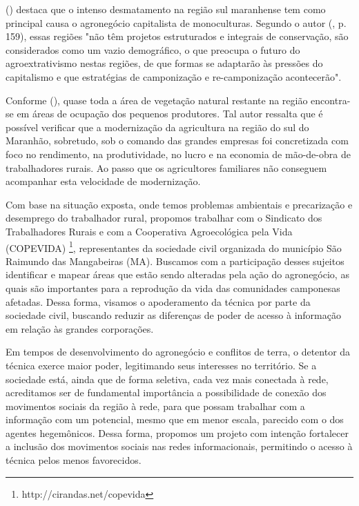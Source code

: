  (\citeyear{meiners2013}) destaca que o intenso desmatamento na região sul maranhense tem como principal causa o agronegócio capitalista de monoculturas. Segundo o autor (\citeyear{meiners2013}, p. 159), essas regiões "não têm projetos estruturados e integrais de conservação, são considerados como um vazio demográfico, o que preocupa o futuro do agroextrativismo nestas regiões, de que formas se adaptarão às pressões do capitalismo e que estratégias de camponização e re-camponização acontecerão".

Conforme  (\citeyear{studte2008}), quase toda a área de vegetação natural restante na região encontra-se em áreas de ocupação dos pequenos produtores. Tal autor ressalta que é possível verificar que a modernização  da  agricultura na região do sul do Maranhão, sobretudo, sob o comando das grandes empresas foi concretizada  com foco no rendimento, na produtividade, no lucro e na economia de mão-de-obra de trabalhadores rurais. Ao passo que os agricultores familiares não conseguem acompanhar esta velocidade de modernização.

Com base na situação exposta, onde temos problemas ambientais e precarização e desemprego do trabalhador rural, propomos trabalhar com o Sindicato dos Trabalhadores Rurais e com a Cooperativa Agroecológica pela Vida (COPEVIDA) \footnote{http://cirandas.net/copevida}, representantes da sociedade civil organizada do município São Raimundo das Mangabeiras (MA). Buscamos com a participação desses sujeitos identificar e mapear áreas que estão sendo alteradas pela ação do agronegócio, as quais são importantes para a reprodução da vida das comunidades camponesas afetadas. Dessa forma, visamos o apoderamento da técnica por parte da sociedade civil, buscando reduzir as diferenças de poder de acesso à informação em relação às grandes corporações.

Em tempos de desenvolvimento do agronegócio e conflitos de terra, o detentor da técnica exerce maior poder, legitimando seus interesses no território. Se a sociedade está, ainda que de forma seletiva, cada vez mais conectada à rede, acreditamos ser de fundamental importância a possibilidade de conexão dos movimentos sociais da região à rede, para que possam trabalhar com a informação com um potencial, mesmo que em menor escala, parecido com o dos agentes hegemônicos. Dessa forma, propomos um projeto com intenção fortalecer a inclusão dos movimentos sociais nas redes informacionais, permitindo o acesso à técnica pelos menos favorecidos. 

